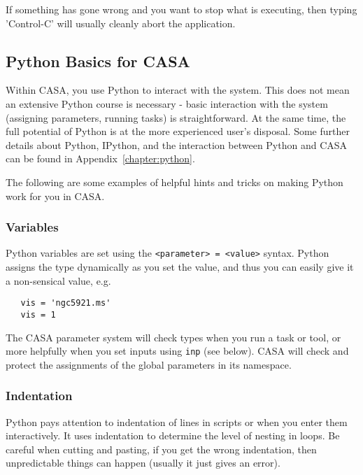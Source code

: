 If something has gone wrong and you want to stop what is executing,
then typing 'Control-C' will usually cleanly abort the application.

\subsection{Python Basics for CASA}
\label{section:intro.basics.python}

Within CASA, you use Python to interact with the system.  This does
not mean an extensive Python course is necessary - basic interaction
with the system (assigning parameters, running tasks) is
straightforward.  At the same time, the full potential of Python is at
the more experienced user's disposal.  Some further details about
Python, IPython, and the interaction between Python and CASA can be
found in Appendix~\ref{chapter:python}.

The following are some examples of helpful hints and tricks on making
Python work for you in CASA.

\subsubsection{Variables}
\label{section:intro.basics.python.var}

Python variables are set using the {\tt <parameter> = <value>} 
syntax.  Python assigns the type dynamically as you set the value,
and thus you can easily give it a non-sensical value, e.g. 
\small
\begin{verbatim}
   vis = 'ngc5921.ms'
   vis = 1
\end{verbatim}
\normalsize
The CASA parameter system will check types when you run a task or
tool, or more helpfully when you set inputs using {\tt inp} (see
below).  CASA will check and protect the assignments of the global
parameters in its namespace.

\subsubsection{Indentation}
\label{section:intro.basics.python.indent}

Python pays attention to indentation of lines in scripts or when you
enter them interactively.  It uses indentation to determine the level
of nesting in loops.  Be careful when cutting and pasting, if you
get the wrong indentation, then unpredictable things can happen
(usually it just gives an error).  

